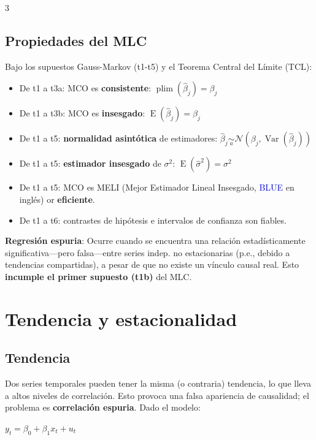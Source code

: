 \documentclass[10pt, a4paper, landscape]{article}
\DeclareMathOperator{\E}{E}
\DeclareMathOperator{\Var}{Var}
\begin{document}
\begin{multicols}{3}
\subsection*{Propiedades del MLC}

Bajo los supuestos Gauss-Markov (t1-t5) y el Teorema Central del Límite (TCL):

\begin{itemize}[leftmargin=*]
	\item De t1 a t3a: MCO es \textbf{consistente}: \( \operatorname{plim}(\hat{\beta}_{j}) = \beta_{j} \)
	\item De t1 a t3b: MCO es \textbf{insesgado}: \( \E(\hat{\beta}_{j}) = \beta_{j} \)
	\item De t1 a t5: \textbf{normalidad asintótica} de estimadores: \( \hat{\beta}_{j} \underset{a}{\sim} \mathcal{N} (\beta_{j}, \Var(\hat{\beta}_{j})) \)
	\item De t1 a t5: \textbf{estimador insesgado} de \( \sigma^{2} \): \( \E(\hat{\sigma}^{2}) = \sigma^{2} \)
	\item De t1 a t5: MCO es MELI (Mejor Estimador Lineal Insesgado, \textcolor{blue}{BLUE} en inglés) or \textbf{eficiente}.
	\item De t1 a t6: contrastes de hipótesis e intervalos de confianza son fiables.
\end{itemize}

\columnbreak

\textbf{Regresión espuria}: Ocurre cuando se encuentra una relación estadísticamente significativa---pero falsa---entre series indep. no estacionarias (p.e., debido a tendencias compartidas), a pesar de que no existe un vínculo causal real. Esto \textbf{incumple el primer supuesto (t1b)} del MLC.

\section*{Tendencia y estacionalidad}

\subsection*{Tendencia}

Dos series temporales pueden tener la misma (o contraria) tendencia, lo que lleva a altos niveles de correlación. Esto provoca una falsa apariencia de causalidad; el problema es \textbf{correlación espuria}. Dado el modelo:

\begin{center}
	\( y_{t} = \beta_{0} + \beta_{1} x_{t} + u_{t} \)
\end{center}


\end{multicols}
\end{document}
